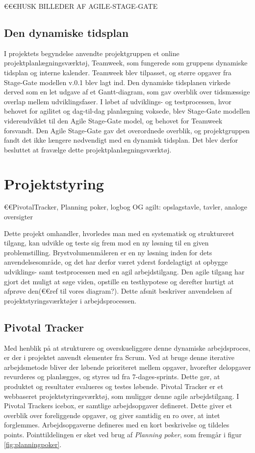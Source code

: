 	€€€HUSK BILLEDER AF AGILE-STAGE-GATE 
	
\subsection{Den dynamiske tidsplan} 
I projektets begyndelse anvendte projektgruppen et online projektplanlægningsværktøj, Teamweek, som fungerede som gruppens dynamiske tidsplan og interne kalender. Teamweek blev tilpasset, og større opgaver fra Stage-Gate modellen v.0.1 blev lagt ind. Den dynamiske tidsplanen virkede derved som en let udgave af et Gantt-diagram, som gav overblik over tidsmæssige overlap mellem udviklingsfaser. I løbet af udviklings- og testprocessen, hvor behovet for agilitet og dag-til-dag planlægning voksede, blev Stage-Gate modellen videreudviklet til den Agile Stage-Gate model, og behovet for Teamweek forsvandt. Den Agile Stage-Gate gav det overordnede overblik, og projektgruppen fandt det ikke længere nødvendigt med en dynamisk tidsplan. Det blev derfor besluttet at fravælge dette projektplanlægningsværktøj.   

\section{Projektstyring}
	€€PivotalTracker, Planning poker, logbog OG agilt: opslagstavle, tavler, analoge oversigter
	
	Dette projekt omhandler, hvorledes man med en systematisk og struktureret tilgang, kan udvikle og teste sig frem mod en ny løsning til en given problemstilling. Brystvolumenmåleren er en ny løsning inden for dets anvendelsesområde, og det har derfor været yderst fordelagtigt at opbygge udviklings- samt testprocessen med en agil arbejdstilgang. Den agile tilgang har gjort det muligt at søge viden, opstille en testhypotese og derefter hurtigt at afprøve den(€€ref til vores diagram?). Dette afsnit beskriver anvendelsen af projektstyringsværktøjer i arbejdsprocessen. 
	\subsection{Pivotal Tracker}
	Med henblik på at strukturere og overskueliggøre denne dynamiske arbejdsproces, er der i projektet anvendt elementer fra Scrum. Ved at bruge denne iterative arbejdsmetode bliver der løbende prioriteret mellem opgaver, hvorefter delopgaver revurderes og planlægges, og styres ud fra 7-dages-sprints. Dette gør, at produktet og resultater evalueres og testes løbende. Pivotal Tracker er et webbaseret projektstyringsværktøj, som muliggør denne agile arbejdstilgang. I Pivotal Trackers icebox, er samtlige arbejdsopgaver defineret. Dette giver et overblik over foreliggende opgaver, og giver samtidig en ro over, at intet forglemmes. Arbejdsopgaverne defineres med en kort beskrivelse og tildeles points. Pointtildelingen er sket ved brug af \textit{Planning poker}, som fremgår i figur \ref{fig:planningpoker}. 
	
